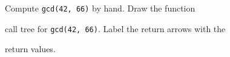 Compute \texttt{gcd(42, 66)} by hand. Draw the function

call tree for \texttt{gcd(42, 66)}. Label the return arrows with the

return values.

